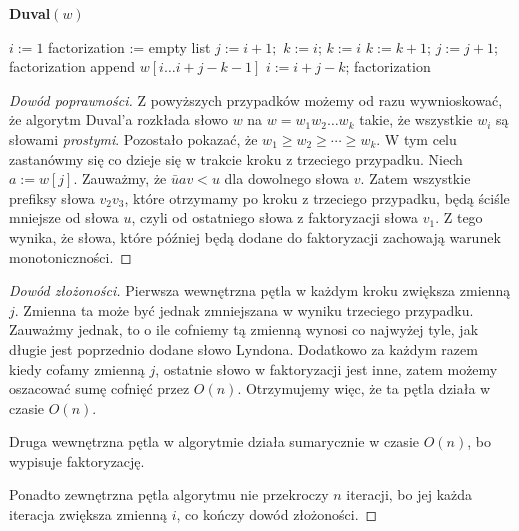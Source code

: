 \documentclass{article}
\begin{document}
\begin{algorithm}[H]
    \caption{\textbf{Duval$(w)$}}
    \begin{algorithmic}
        \State $i := 1$
        \State factorization := empty list
            \State $j := i+1;$  $k := i$;
                    \State $k := i$
                \Else
                    \State $k := k + 1$;
                \EndIf
                \State $j := j + 1$;
            \EndWhile
                \State factorization append $w[i\ldots i+j-k-1]$
                \State $i := i + j - k$;
           \EndWhile
        \EndWhile
        \State \Return factorization
    \end{algorithmic}
\end{algorithm}

\begin{proof}[Dowód poprawności]
    Z powyższych przypadków możemy od razu wywnioskować, że algorytm Duval'a rozkłada słowo $w$ na 
    $w = w_1w_2\ldots w_k$ takie, że wszystkie $w_i$ są słowami \textit{prostymi}.
    Pozostało pokazać, że $w_1 \geq w_2 \geq \cdots \geq w_k$. 
    W tym celu zastanówmy się co dzieje się w trakcie kroku z trzeciego przypadku. Niech $a := w[j]$. 
    Zauważmy, że $\bar{u}av < u$ dla 
    dowolnego słowa $v$. Zatem wszystkie prefiksy słowa $v_2v_3$, które otrzymamy po kroku z trzeciego przypadku,
    będą ściśle mniejsze od słowa $u$, czyli od ostatniego słowa z faktoryzacji słowa $v_1$. 
    Z tego wynika, że słowa, które później będą dodane do faktoryzacji zachowają warunek monotoniczności.
\end{proof}

\begin{proof}[Dowód złożoności]    
    Pierwsza wewnętrzna pętla w każdym kroku zwiększa zmienną $j$. Zmienna ta
    może być jednak zmniejszana w wyniku trzeciego przypadku. Zauważmy jednak, 
    to o ile cofniemy tą zmienną wynosi co najwyżej tyle, jak długie jest poprzednio dodane słowo Lyndona. 
    Dodatkowo za każdym razem kiedy cofamy zmienną $j$, ostatnie słowo w faktoryzacji jest inne, zatem
    możemy oszacować sumę cofnięć przez $O(n)$. Otrzymujemy więc, że ta pętla działa w czasie $O(n)$.
    
    
    Druga wewnętrzna pętla w algorytmie działa sumarycznie w czasie $O(n)$, bo wypisuje faktoryzację.

    Ponadto zewnętrzna pętla algorytmu nie przekroczy $n$ iteracji, 
    bo jej każda iteracja zwiększa zmienną $i$, co kończy dowód złożoności.
\end{proof}
\end{document}
